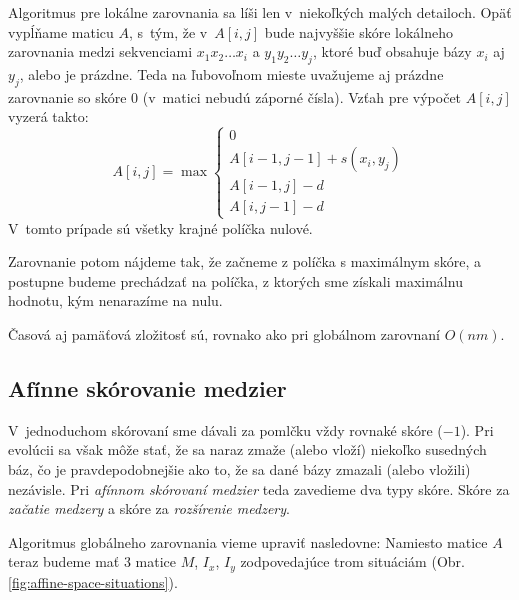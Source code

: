 Algoritmus pre lokálne zarovnania sa líši len v~niekoľkých malých detailoch. Opäť vypĺňame maticu $A$, s~tým, že v~$A[i,j]$ bude najvyššie skóre lokálneho zarovnania medzi sekvenciami $x_1x_2\dots x_i$ a $y_1y_2\dots y_j$, ktoré buď obsahuje bázy $x_i$ aj $y_j$, alebo je prázdne. Teda na ľubovoľnom mieste uvažujeme aj prázdne zarovnanie so skóre 0 (v~matici nebudú záporné čísla). Vzťah pre výpočet $A[i,j]$ vyzerá takto:
$$A[i,j] = \max \left\{
\begin{array}{l}
0\\
A[i-1,j-1]+s(x_i, y_j)\\
A[i-1,j]-d\\
A[i,j-1]-d
\end{array} \right.$$
V~tomto prípade sú všetky krajné políčka nulové.

Zarovnanie potom nájdeme tak, že začneme z políčka s maximálnym skóre, a postupne budeme prechádzať na políčka, z ktorých sme získali maximálnu hodnotu, kým nenarazíme na nulu.

Časová aj pamäťová zložitosť sú, rovnako ako pri globálnom zarovnaní $O(nm)$.

\subsection{Afínne skórovanie medzier}
\label{subsec:affine-gap-scoring}
V~jednoduchom skórovaní sme dávali za pomlčku vždy rovnaké skóre ($-1$). Pri evolúcii sa však môže stať, že sa naraz zmaže (alebo vloží) niekoľko susedných báz, čo je pravdepodobnejšie ako to, že sa dané bázy zmazali (alebo vložili) nezávisle. Pri \textit{afínnom skórovaní medzier} teda zavedieme dva typy skóre. Skóre za \textit{začatie medzery} a skóre za \textit{rozšírenie medzery}.

Algoritmus globálneho zarovnania vieme upraviť nasledovne: Namiesto matice $A$ teraz budeme mať 3 matice $M$, $I_x$, $I_y$ zodpovedajúce trom situáciám (Obr. \ref{fig:affine-space-situations}).

